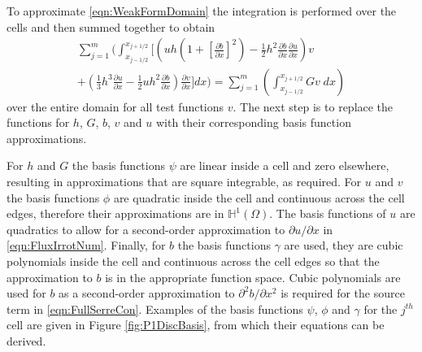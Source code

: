 \documentclass[times]{elsarticle}
\begin{document}
To approximate \eqref{eqn:WeakFormDomain} the integration is performed over the cells and then summed together to obtain
\begin{multline}
\label{eq:elementwiseint}
\sum_{j=1}^m \Bigg(  \int_{x_{j-1/2} }^{{x_{j+1/2}}} \Bigg[  \left( uh \left(1 + \left[\frac{\partial b}{\partial x}\right]^2 \right)  - \frac{1}{2}h^2\frac{\partial b}{\partial x}  \frac{\partial u }{\partial x} \right) v   \\ +  \left(\frac{1}{3}h^3  \frac{\partial {u}}{\partial x}    -     \frac{1}{2} uh^2\frac{\partial b}{\partial x}    \right) \frac{\partial v }{\partial x} \Bigg]dx \Bigg)  =  \sum_{j=1}^m \left( \int_{x_{j-1/2} }^{{x_{j+1/2}}} Gv \; dx  \right)
\end{multline}
over the entire domain for all test functions $v$. The next step is to replace the functions for $h$, $G$, $b$, $v$ and $u$ with their corresponding basis function approximations.

For $h$ and $G$ the basis functions $\psi$ are linear inside a cell and zero elsewhere, resulting in approximations that are square integrable, as required.
For $u$ and $v$ the basis functions $\phi$ are quadratic inside the cell and continuous across the cell edges, therefore their approximations are in $\mathbb{H}^{1}(\Omega)$. The basis functions of $u$ are quadratics to allow for a second-order approximation to $\partial u / \partial x$ in \eqref{eqn:FluxIrrotNum}. Finally, for $b$ the basis functions $\gamma$ are used, they are cubic polynomials inside the cell and continuous across the cell edges so that the approximation to $b$ is in the appropriate function space. Cubic polynomials are used for $b$ as a second-order approximation to $\partial^2 b / \partial x^2$ is required for the source term in \eqref{eqn:FullSerreCon}. Examples of the basis functions $\psi$, $\phi$ and $\gamma$ for the $j^{th}$ cell are given in Figure \ref{fig:P1DiscBasis}, from which their equations can be derived.
\end{document}
